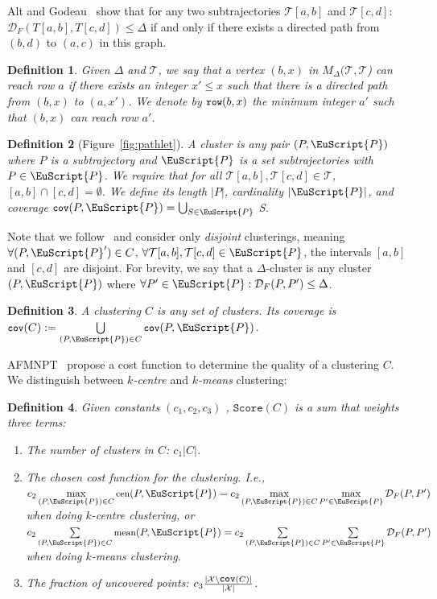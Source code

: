 \documentclass[11pt]{article}
\newcommand{\fancy}[1]{\EuScript{#1}}
\newcommand{\Cov}{\texttt{\small cov}}
\newcommand{\fd}{\mathcal{D}_F}
\newcommand{\means}{\textnormal{\small mean}}
\newcommand{\centercost}{{\textnormal{\small cen}}}
\newcommand{\minrow}{\texttt{\small row}}
\newcommand{\pathlet}{cluster\xspace}
\newcommand{\pathlets}{clusters\xspace}
\newtheorem{definition}{Definition}
\begin{document}
%
\noindent
Alt and Godeau~\cite{alt1995computing} show that for any two subtrajectories $\mathcal{T}[a, b]$  and $\mathcal{T}[c, d]$: $\fd(T[a, b], T[c, d]) \leq \Delta$ if and only if there exists a directed path from $(b, d)$ to $(a, c)$ in this graph. 
%
\begin{definition}
\label{def:minrow}
    Given $\Delta$ and $\mathcal{T}$, we say that a vertex $(b, x)$ in $M_\Delta(\mathcal{T}, \mathcal{T}$) can \emph{reach} row $a$ if there exists an integer $x' \leq x$ such that there is a directed path from $(b, x)$ to $(a, x')$. We denote by $\minrow(b, x)$ the minimum integer $a'$ such that $(b, x)$ can reach row $a'$. 
    \end{definition}
%
\begin{definition}[Figure~\ref{fig:pathlet}]
    A \pathlet  is any pair $(P, {\fancy{P}})$ where $P$ is a subtrajectory and ${\fancy{P}}$ is a set subtrajectories with $P \in {\fancy{P}}$. We require that for all $\mathcal{T}[a, b], \mathcal{T}[c, d] \in \mathcal{T}$, $[a, b] \cap [c, d] = \emptyset$.     
    We define its \emph{length} $|P|$, \emph{cardinality} $|{\fancy{P}}|$, and \emph{coverage} $\Cov(P, {\fancy{P}}) =  \bigcup_{S \in {\fancy{P}}}$ S. 
\end{definition}
%
%
%
\noindent
Note that we follow~\cite{agarwal2018subtrajectory, buchin2017clustering, buchin2020improved, buchin2011detecting} and consider only \emph{disjoint} clusterings, meaning $\forall (P, {\fancy{P}}') \in C$, $\forall \mathcal{T}[a, b], \mathcal{T}[c, d] \in {\fancy{P}}$, the intervals $[a, b]$ and $[c, d]$ are disjoint.
For brevity, we say that a $\Delta$-\pathlet is any \pathlet $(P, {\fancy{P}})$ where $\forall P' \in {\fancy{P}} : \fd(P, P') \leq \Delta$.
%
\begin{definition}
A \emph{clustering} $C$ is any set of \pathlets. 
Its \emph{coverage} is $\Cov(C) := \bigcup\limits_{(P, {\fancy{P}}) \in C} \Cov(P, {\fancy{P}})$. 
\end{definition}
%
%
\noindent
AFMNPT~\cite{agarwal2018subtrajectory} propose a cost function to determine the quality of a clustering $C$.
We distinguish between \emph{$k$-centre} and \emph{$k$-means} clustering: 
%
\begin{definition}
\label{def:score}
Given constants $(c_1, c_2, c_3)$ , 
$\texttt{Score}(C)$ is a sum that weights three terms:
    \begin{enumerate}
    \item The number of \pathlets in $C$: $c_1 |C|$.
\item The chosen cost function for the clustering. I.e.,
%
    $c_2 \max\limits_{(P, {\fancy{P}}) \in C} \centercost(P, {\fancy{P}}) = c_2 \max\limits_{(P, {\fancy{P}}) \in C} \max\limits_{P' \in {\fancy{P}}} \fd(P, P')$ when doing $k$-centre clustering, or 
%
         $c_2 \sum\limits_{(P, {\fancy{P}}) \in C} \means(P, {\fancy{P}})  = c_2 \sum\limits_{(P, {\fancy{P}}) \in C} \sum\limits_{P' \in {\fancy{P}}} \fd(P, P')$ when doing $k$-means clustering. 
\item The fraction of uncovered points: $c_3 \frac{| \mathcal{X} \backslash \Cov(C) |}{|\mathcal{X}|}$.
\end{enumerate}
\end{definition}
\end{document}
